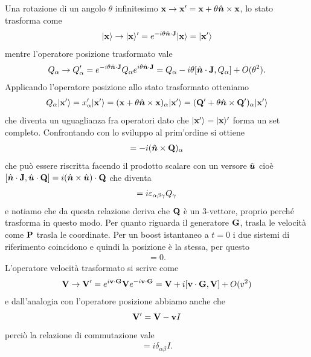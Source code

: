 Una rotazione di un angolo $ \theta $ infinitesimo $ \mathbf{x} \to \mathbf{x'} = \mathbf{x} + \theta\hat{\boldsymbol{n}} \times \mathbf{x} $, lo stato trasforma come 
\begin{align*}
  \vert \mathbf{x} \rangle \to \vert \mathbf{x} \rangle' = e^{-i \theta \hat{\boldsymbol{n}} \cdot \mathbf{J}}\vert \mathbf{x} \rangle = \vert \mathbf{x'} \rangle
\end{align*}
mentre l'operatore posizione trasformato vale 
\begin{align*}
  Q_\alpha \to Q'_\alpha = e^{- i \theta \hat{\boldsymbol{n}} \cdot \mathbf{J}} Q_\alpha e^{ i \theta \hat{\boldsymbol{n}} \cdot \mathbf{J}} 
  = Q_\alpha - i \theta[ \hat{\boldsymbol{n}} \cdot \mathbf{J}, Q_\alpha] + O(\theta^2).
\end{align*}
Applicando l'operatore posizione allo stato trasformato otteniamo 
\begin{align*}
  Q_\alpha \vert \mathbf{x'} \rangle = x'_\alpha \vert \mathbf{x'} \rangle = (\mathbf{x} + \theta\hat{\boldsymbol{n}} \times \mathbf{x})_\alpha \vert \mathbf{x'} \rangle 
  = (\mathbf{Q'} + \theta \hat{\boldsymbol{n}} \times \mathbf{Q'})_\alpha \vert \mathbf{x'} \rangle
\end{align*}
che diventa un uguaglianza fra operatori dato che $ \vert \mathbf{x'} \rangle = \vert \mathbf{x} \rangle' $ forma un set completo. Confrontando con lo sviluppo al prim'ordine si ottiene 
\begin{align*}
  [ \vers{n} \cdot \v{J}, Q_\alpha] = -i (\vers{n} \times \v{Q})_\alpha
\end{align*}
che può essere riscritta facendo il prodotto scalare con un versore $ \hat{\boldsymbol{u}} $ cioè 
$ [ \hat{\boldsymbol{n}} \cdot \mathbf{J}, \hat{\boldsymbol{u}} \cdot \mathbf{Q}] = i (\hat{\boldsymbol{n}} \times \hat{\boldsymbol{u}}) \cdot \mathbf{Q} $ che diventa 
\begin{align*}
  [J_\alpha, Q_\beta] = i \eps_{\alpha \beta \gamma} Q_\gamma
\end{align*}
e notiamo che da questa relazione deriva che $ \mathbf{Q} $ è un 3-vettore, proprio perché trasforma in questo modo.
Per quanto riguarda il generatore $ \mathbf{G} $, trasla le velocità come $ \mathbf{P} $ trasla le coordinate. Per un boost istantaneo a $ t = 0 $ i due sistemi 
di riferimento coincidono e quindi la posizione è la stessa, per questo 
\begin{align*}
  [G_\alpha, Q_\beta] = 0.
\end{align*}
L'operatore velocità trasformato si scrive come 
\begin{align*}
  \mathbf{V} \to \mathbf{V'} = e^{i \mathbf{v} \cdot \mathbf{G}} \mathbf{V} e^{-i \mathbf{v} \cdot \mathbf{G}} = \mathbf{V} + i[\mathbf{v\cdot G}, \mathbf{V}] +O(v^2)
\end{align*}
e dall'analogia con l'operatore posizione abbiamo anche che
\begin{align*}
  \mathbf{V'} = \mathbf{V} -\mathbf{v} I
\end{align*}
perciò la relazione di commutazione vale 
\begin{align*}
  [G_\alpha, V_\beta] = i \delta_{\alpha \beta} I.
\end{align*}

